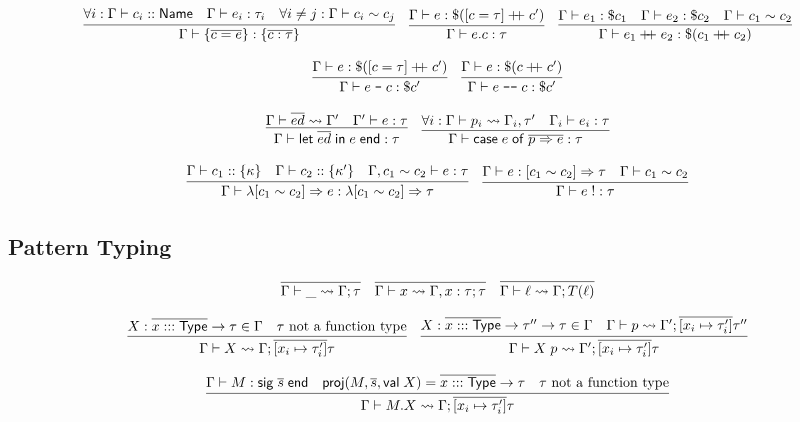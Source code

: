 \documentclass{article}
\newcommand{\mt}[1]{\mathsf{#1}}
\newcommand{\rc}{+ \hspace{-.075in} + \;}
\newcommand{\rcut}{\; \texttt{--} \;}
\newcommand{\rcutM}{\; \texttt{---} \;}
\begin{document}
$$\infer{\Gamma \vdash \{\overline{c = e}\} : \{\overline{c : \tau}\}}{
  \forall i: \Gamma \vdash c_i :: \mt{Name}
  & \Gamma \vdash e_i : \tau_i
  & \forall i \neq j: \Gamma \vdash c_i \sim c_j
}
\quad \infer{\Gamma \vdash e.c : \tau}{
  \Gamma \vdash e : \$([c = \tau] \rc c')
}
\quad \infer{\Gamma \vdash e_1 \rc e_2 : \$(c_1 \rc c_2)}{
  \Gamma \vdash e_1 : \$c_1
  & \Gamma \vdash e_2 : \$c_2
  & \Gamma \vdash c_1 \sim c_2
}$$

$$\infer{\Gamma \vdash e \rcut c : \$c'}{
  \Gamma \vdash e : \$([c = \tau] \rc c')
}
\quad \infer{\Gamma \vdash e \rcutM c : \$c'}{
  \Gamma \vdash e : \$(c \rc c')
}$$

$$\infer{\Gamma \vdash \mt{let} \; \overline{ed} \; \mt{in} \; e \; \mt{end} : \tau}{
  \Gamma \vdash \overline{ed} \leadsto \Gamma'
  & \Gamma' \vdash e : \tau
}
\quad \infer{\Gamma \vdash \mt{case} \; e \; \mt{of} \; \overline{p \Rightarrow e} : \tau}{
  \forall i: \Gamma \vdash p_i \leadsto \Gamma_i, \tau'
  & \Gamma_i \vdash e_i : \tau
}$$

$$\infer{\Gamma \vdash \lambda [c_1 \sim c_2] \Rightarrow e : \lambda [c_1 \sim c_2] \Rightarrow \tau}{
  \Gamma \vdash c_1 :: \{\kappa\}
  & \Gamma \vdash c_2 :: \{\kappa'\}
  & \Gamma, c_1 \sim c_2 \vdash e : \tau
}
\quad \infer{\Gamma \vdash e \; ! : \tau}{
  \Gamma \vdash e : [c_1 \sim c_2] \Rightarrow \tau
  & \Gamma \vdash c_1 \sim c_2
}$$

\subsection{Pattern Typing}

$$\infer{\Gamma \vdash \_ \leadsto \Gamma; \tau}{}
\quad \infer{\Gamma \vdash x \leadsto \Gamma, x : \tau; \tau}{}
\quad \infer{\Gamma \vdash \ell \leadsto \Gamma; T(\ell)}{}$$

$$\infer{\Gamma \vdash X \leadsto \Gamma; \overline{[x_i \mapsto \tau'_i]}\tau}{
  X : \overline{x ::: \mt{Type}} \to \tau \in \Gamma
  & \textrm{$\tau$ not a function type}
}
\quad \infer{\Gamma \vdash X \; p \leadsto \Gamma'; \overline{[x_i \mapsto \tau'_i]}\tau}{
  X : \overline{x ::: \mt{Type}} \to \tau'' \to \tau \in \Gamma
  & \Gamma \vdash p \leadsto \Gamma'; \overline{[x_i \mapsto \tau'_i]}\tau''
}$$

$$\infer{\Gamma \vdash M.X \leadsto \Gamma; \overline{[x_i \mapsto \tau'_i]}\tau}{
  \Gamma \vdash M : \mt{sig} \; \overline{s} \; \mt{end}
  & \mt{proj}(M, \overline{s}, \mt{val} \; X) = \overline{x ::: \mt{Type}} \to \tau
  & \textrm{$\tau$ not a function type}
}$$
\end{document}
